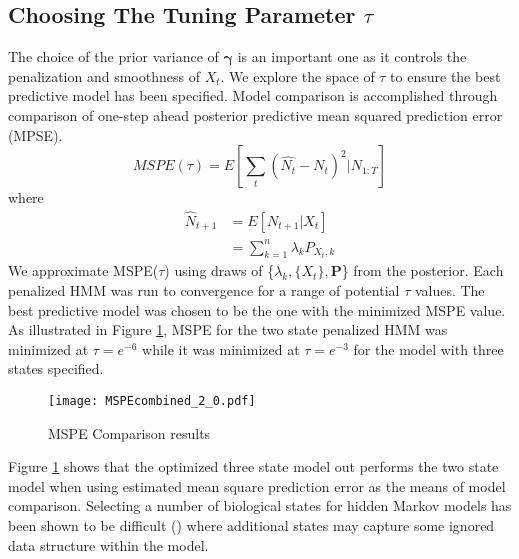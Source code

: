 \documentclass[smallextended]{svjour3}       %
\begin{document}
\subsection{Choosing The Tuning Parameter $\tau$}
\label{ss:compare}
The choice of the prior variance of $\bm{\gamma}$ is an important one as it controls the penalization and smoothness of $X_t$. We explore the space of $\tau$ to ensure the best predictive model has been specified. Model comparison is accomplished through comparison of one-step ahead posterior predictive mean squared prediction error (MPSE). 
\begin{equation}
MSPE(\tau) = E\left[ \sum_t (\hat{N_t} - N_t)^2 | N_{1:T}\right]
\end{equation}
where
\begin{align}
\hat{N}_{t+1}&= E\left[ N_{t+1} | X_t \right]
\\
&= \sum_{k=1}^n \lambda_k P_{X_t, k}
\end{align}
We approximate MSPE($\tau$) using draws of \{$\lambda_k, \{X_t\}, \mathbf{P}$\} from the posterior.  Each penalized HMM was run to convergence for a range of potential $\tau$ values. The best predictive model was chosen to be the one with the minimized MSPE value. 
As illustrated in Figure \ref{f:MSPEpen2&3}, MSPE for the two state penalized HMM was minimized at $\tau = e^{-6}$ while it was minimized at $\tau = e^{-3}$ for the model with three states specified. 
\begin{figure}
 \centerline{\texttt{[image: MSPEcombined\_2\_0.pdf]}}
\caption{MSPE Comparison results }
\label{f:MSPEpen2&3}
\end{figure}
Figure \ref{f:MSPEpen2&3} shows that the optimized three state model out performs the two state model when using estimated mean square prediction error as the means of model comparison. Selecting a number of biological states for hidden Markov models has been shown to be difficult (\cite{Pohle2017}) where additional states may capture some ignored data structure within the model. 
\end{document}
